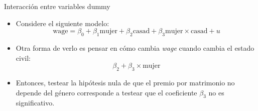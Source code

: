 \documentclass{beamer}
\begin{document}
\begin{frame}{Interacción entre variables dummy}
    \begin{itemize}
        \item Considere el siguiente modelo:
        \begin{equation*}
            \text{wage} = \beta_0 + \beta_1 \text{mujer} + \beta_2 \text{casad} + \beta_3 \text{mujer} \times \text{casad} + u
        \end{equation*}
        \item Otra forma de verlo es pensar en cómo cambia \textit{wage} cuando cambia el estado civil:
        \begin{equation*}
            \beta_2 + \beta_3 \times \text{mujer}
        \end{equation*}
        \item {\color{red}Entonces, testear la hipótesis nula de que el premio por matrimonio no depende del género corresponde a testear que el coeficiente \(\beta_3\) no es significativo.}
        
    \end{itemize}
\end{frame}
\end{document}
